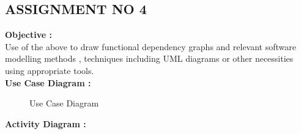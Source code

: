 \documentclass[oneside,a4paper,12pt]{report}
\begin{document}
{\begin{appendices}
\pagebreak

\section{ASSIGNMENT NO 4}

\textbf{Objective : } \\
Use of the above to draw functional dependency graphs and relevant software modelling methods , techniques including UML diagrams or other necessities using appropriate tools. \\

\textbf{Use Case Diagram : }

\begin{center}
	\begin{figure}[H]
		\centering
	  \caption{Use Case Diagram}
	  \label{fig:state-dig}
	\end{figure}
\end{center} 

\pagebreak
\textbf{Activity Diagram : }


\end{appendices}}
\end{document}
